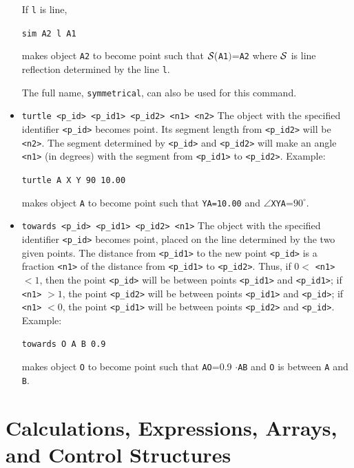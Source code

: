 \documentclass[a4paper]{book}
\begin{document}
\begin{itemize}
        If \verb|l| is {\sc line},

        \verb|sim A2 l A1|

        makes object \verb|A2| to become {\sc point} such that 
        ${\cal S}($\verb|A1|$)$=\verb|A2| where ${\cal S}$ is line 
        reflection determined by the line \verb|l|.

        The full name, \verb|symmetrical|, can also be used for this command.

\item \verb|turtle <p_id> <p_id1> <p_id2> <n1> <n2>|
        The object with the specified identifier \verb|<p_id>| becomes {\sc point}.
        Its segment length from \verb|<p_id2>| will be \verb|<n2>|.
        The segment determined by \verb|<p_id>| and \verb|<p_id2>|
        will make an angle \verb|<n1>| (in degrees) with the segment
        from \verb|<p_id1>| to \verb|<p_id2>|. Example:

        \verb|turtle A X Y 90 10.00|

        makes object \verb|A| to become {\sc point} such that \verb|YA=10.00|
        and $\angle$\verb|XYA|=$90^\circ$.

\item \verb|towards <p_id> <p_id1> <p_id2> <n1>|
        The object with the specified identifier \verb|<p_id>| becomes {\sc point},
        placed on the line determined by the two given points.
        The distance from \verb|<p_id1>| to the new point \verb|<p_id>| is a
        fraction \verb|<n1>| of the distance from \verb|<p_id1>| to \verb|<p_id2>|.
        Thus, if $0<$ \verb|<n1>| $<1$, then the point \verb|<p_id>| will be between
        points \verb|<p_id1>| and \verb|<p_id1>|;
        if \verb|<n1>| $>1$, the point \verb|<p_id2>| will be between
        points \verb|<p_id1>| and \verb|<p_id>|;
        if \verb|<n1>| $<0$, the point \verb|<p_id1>| will be between
        points \verb|<p_id2>| and \verb|<p_id>|.
        Example:

        \verb|towards O A B 0.9|

        makes object \verb|O| to become {\sc point} such that
        \verb|AO|=0.9 $\cdot$\verb|AB| and \verb|O| is between \verb|A| and \verb|B|.
\end{itemize}



\section{Calculations, Expressions, Arrays, and Control Structures}
\label{subsec:expr}
\end{document}
